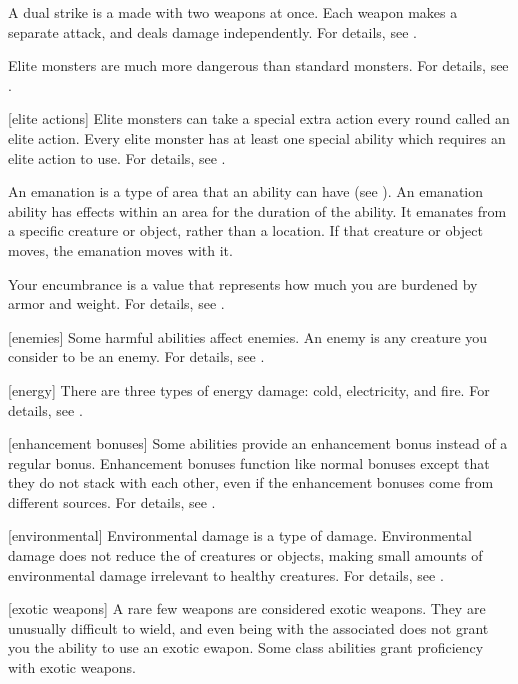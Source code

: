  A dual strike is a  made with two weapons at once.
Each weapon makes a separate attack, and deals damage independently.
For details, see .

 Elite monsters are much more dangerous than standard monsters.
For details, see .

[elite actions] Elite monsters can take a special extra action every round called an elite action.
Every elite monster has at least one special ability which requires an elite action to use.
For details, see .

 An emanation is a type of area that an ability can have (see ).
An emanation ability has effects within an area for the duration of the ability.
It emanates from a specific creature or object, rather than a location.
If that creature or object moves, the emanation moves with it.

 Your encumbrance is a value that represents how much you are burdened by armor and weight.
For details, see .

[enemies] Some harmful abilities affect enemies.
An enemy is any creature you consider to be an enemy.
For details, see .

[energy] There are three types of energy damage: cold, electricity, and fire.
For details, see .

[enhancement bonuses] Some abilities provide an enhancement bonus instead of a regular bonus.
Enhancement bonuses function like normal bonuses except that they do not stack with each other, even if the enhancement bonuses come from different sources.
For details, see .

[environmental] Environmental damage is a type of damage.
Environmental damage does not reduce the  of creatures or objects, making small amounts of environmental damage irrelevant to healthy creatures.
For details, see .

[exotic weapons] A rare few weapons are considered exotic weapons.
They are unusually difficult to wield, and even being  with the associated  does not grant you the ability to use an exotic ewapon.
Some class abilities grant proficiency with exotic weapons.

